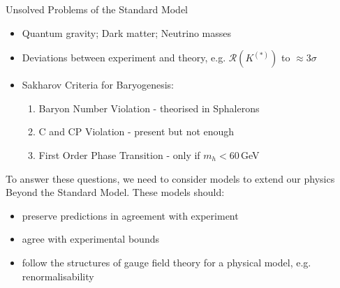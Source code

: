 \documentclass[10pt,xcolor={table,dvipsnames},t]{beamer}
\begin{document}
\begin{frame}{Unsolved Problems of the Standard Model}
    \begin{itemize}
        \item Quantum gravity; Dark matter; Neutrino masses
        \item Deviations between experiment and theory, e.g. $\mathcal{R}(K^{(*)})$ to $\approx3\sigma$ %
        \item Sakharov Criteria for Baryogenesis:
            \begin{enumerate}
                \item Baryon Number Violation - theorised in Sphalerons
                \item C and CP Violation - present but not enough
                \item First Order Phase Transition - only if $m_h<60\,$GeV 
            \end{enumerate}
    \end{itemize}
    To answer these questions, we need to consider models to extend our physics Beyond the Standard Model. 
    These models should:
    \begin{itemize}
        \item preserve predictions in agreement with experiment
        \item agree with experimental bounds
        \item follow the structures of gauge field theory for a physical model, e.g. renormalisability
    \end{itemize}
\end{frame}
\end{document}
